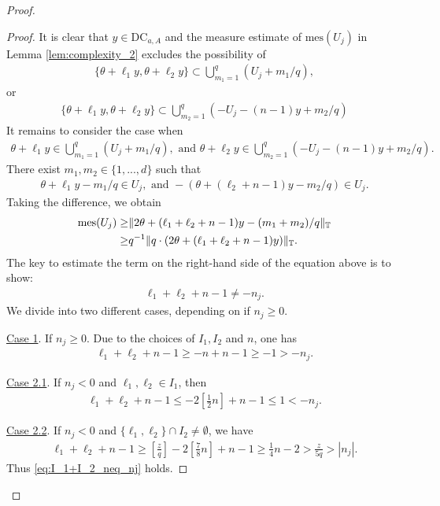\documentclass[11pt]{amsart}
\newcommand{\T}{\mathbb T}
\begin{document}
\begin{proof}
\begin{proof}
It is clear that $y\in \mathrm{DC}_{a,A}$ and the measure estimate of $\mathrm{mes}(U_j)$ in Lemma \ref{lem:complexity_2} excludes the possibility of 
\begin{align}
    \{\theta+\ell_1 y, \theta+\ell_2 y\}\subset  \bigcup_{m_1=1}^q (U_j+m_1/q),
\end{align}
or 
\begin{align}
    \{\theta+\ell_1 y, \theta+\ell_2 y\}\subset  \bigcup_{m_2=1}^q (-U_j-(n-1)y+m_2/q)
\end{align}
It remains to consider the case when
\begin{align}\label{eq:assume_I1_I2_2'}
    \theta+\ell_1 y\in \bigcup_{m_1=1}^q (U_j+m_1/q), \text{ and } \theta+\ell_2 y\in \bigcup_{m_2=1}^q(-U_j-(n-1)y+m_2/q).
\end{align}
There exist $m_1,m_2\in \{1,...,d\}$ such that
\begin{align}
    \theta+\ell_1 y-m_1/q\in U_j, \text{ and } -(\theta+(\ell_2+n-1)y- m_2/q)\in U_j.
\end{align}
Taking the difference, we obtain
\begin{align}\label{eq:Uj_contra_1}
    \mathrm{mes}(U_j)
    \geq &\|2\theta+(\ell_1+\ell_2+n-1)y-(m_1+m_2)/q\|_{\T} \notag\\
    \geq &q^{-1}\|q\cdot (2\theta+(\ell_1+\ell_2+n-1)y)\|_{\T}.
\end{align}
The key to estimate the term on the right-hand side of the equation above is to show:
\begin{align}\label{eq:I_1+I_2_neq_nj}
\ell_1+\ell_2+n-1\neq -n_j.   
\end{align}
We divide into two different cases, depending on if $n_j\geq 0$.

\underline{Case 1}. If $n_j\geq 0$. Due to the choices of $I_1, I_2$ and $n$, one has
\begin{align}\label{eq:l1+l2_1}
    \ell_1+\ell_2+n-1\geq -n+n-1\geq -1>-n_j.
\end{align}

\underline{Case 2.1}. If $n_j<0$ and $\ell_1,\ell_2\in I_1$, then
\begin{align}
    \ell_1+\ell_2+n-1\leq -2[\frac{1}{2}n]+n-1\leq 1<-n_j.
\end{align}

\underline{Case 2.2}. If $n_j<0$ and $\{\ell_1,\ell_2\}\cap I_2\neq \emptyset$, we have
\begin{align}
    \ell_1+\ell_2+n-1\geq [\frac{z}{q}]-2[\frac{7}{8}n]+n-1\geq \frac{1}{4}n-2>\frac{z}{5q}>|n_j|.
\end{align}
Thus   \eqref{eq:I_1+I_2_neq_nj} holds.


\end{proof}
\end{proof}
\end{document}
